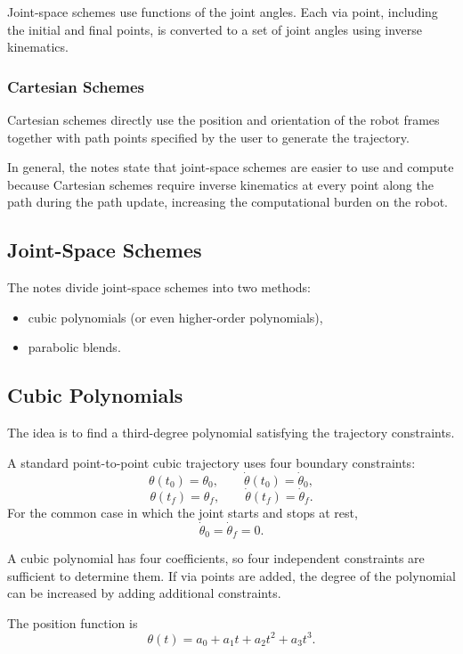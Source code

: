 \documentclass[11pt]{article}
\begin{document}
Joint-space schemes use functions of the joint angles. Each via point, including the initial and final points, is converted to a set of joint angles using inverse kinematics.

\subsubsection{Cartesian Schemes}

Cartesian schemes directly use the position and orientation of the robot frames together with path points specified by the user to generate the trajectory.

In general, the notes state that joint-space schemes are easier to use and compute because Cartesian schemes require inverse kinematics at every point along the path during the path update, increasing the computational burden on the robot.

\subsection{Joint-Space Schemes}

The notes divide joint-space schemes into two methods:
\begin{itemize}
    \item cubic polynomials (or even higher-order polynomials),
    \item parabolic blends.
\end{itemize}

\subsection{Cubic Polynomials}

The idea is to find a third-degree polynomial satisfying the trajectory constraints.

A standard point-to-point cubic trajectory uses four boundary constraints:
\[
\theta(t_0)=\theta_0,
\qquad
\dot\theta(t_0)=\dot\theta_0,
\]
\[
\theta(t_f)=\theta_f,
\qquad
\dot\theta(t_f)=\dot\theta_f.
\]
For the common case in which the joint starts and stops at rest,
\[
\dot\theta_0=\dot\theta_f=0.
\]

A cubic polynomial has four coefficients, so four independent constraints are sufficient to determine them. If via points are added, the degree of the polynomial can be increased by adding additional constraints.

The position function is
\[
\boxed{
\theta(t)=a_0+a_1t+a_2t^2+a_3t^3
}.
\]
\end{document}
